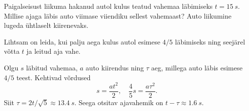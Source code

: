 
Paigalseisust liikuma hakanud autol kulus teatud vahemaa läbimiseks $t = \SI{15}{s}$. Millise ajaga läbis auto viimase viiendiku sellest vahemaast? Auto liikumine lugeda ühtlaselt kiirenevaks.

\hint
Lihtsam on leida, kui palju aega kulus autol esimese $4/5$ läbimiseks ning seejärel võtta $t$ ja leitud aja vahe.

\solu
Olgu $s$ läbitud vahemaa, $a$ auto kiirendus ning $\tau$ aeg, millega auto läbis esimese $4/5$ teest. Kehtivad võrdused
\[
s=\frac{a t^{2}}{2}, \quad \frac{4}{5} s=\frac{a \tau^{2}}{2}.
\]
Siit $\tau = 2t/\sqrt 5\approx \SI{13,4}{s}$. Seega otsitav ajavahemik on $t-\tau\approx \SI{1,6}{s}$.
\probend